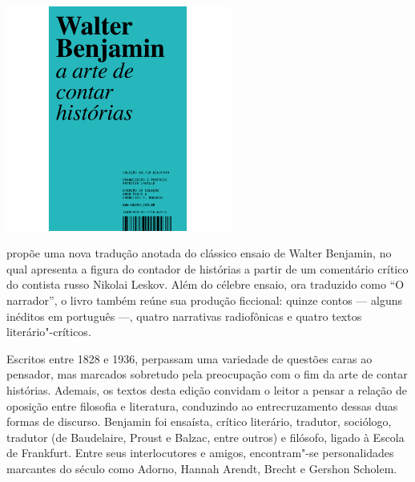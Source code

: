 \pagebreak


\begin{center}
\hspace*{.5cm}\includegraphics[width=74mm]{./grid/benjamin.jpg}
\end{center}

\hspace*{-7cm}\hrulefill\hspace*{-7cm}

\medskip

 propõe uma nova tradução anotada do clássico ensaio de Walter Benjamin, no qual apresenta a figura do contador de histórias a partir de um comentário crítico do contista russo Nikolai Leskov. Além do célebre ensaio, ora traduzido como “O narrador”, o livro também reúne sua produção ficcional: quinze contos --- alguns inéditos em português ---, quatro narrativas radiofônicas e quatro textos literário"-críticos.

Escritos entre 1828 e 1936, perpassam uma variedade de questões caras ao pensador, mas marcados sobretudo pela preocupação com o fim da arte de contar histórias. Ademais, os textos desta edição convidam o leitor a pensar a relação de oposição entre filosofia e literatura, conduzindo ao entrecruzamento dessas duas formas de discurso. Benjamin foi ensaísta, crítico literário, tradutor, sociólogo, tradutor (de Baudelaire, Proust e Balzac, entre outros) e filósofo, ligado à Escola de Frankfurt. Entre seus interlocutores e amigos, encontram"-se personalidades marcantes do século  como Adorno, Hannah Arendt, Brecht e Gershon Scholem.


\vfill

\hspace*{-.4cm}\begin{minipage}[c]{.6\linewidth}
\small{
{}}
\end{minipage}


